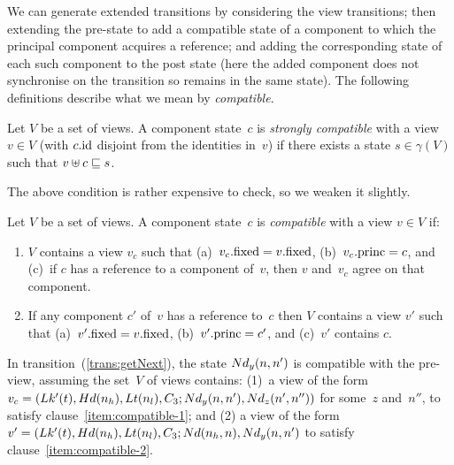 We can generate extended transitions by considering the view transitions; then
extending the pre-state to add a compatible state of a component to which the
principal component acquires a reference; and adding the corresponding state
of each such component to the post state (here the added component does not
synchronise on the transition so remains in the same state).  The following
definitions describe what we mean by \emph{compatible}.


\begin{definition}
Let $V$ be a set of views.  A component state~$c$ is \emph{strongly
  compatible} with a view~$v \in V$ (with $c.\mathrm{id}$ disjoint from the identities
in~$v$) if there exists a state $s \in \gamma(V)$ such that $v \uplus c \sqsubseteq
s$.
\end{definition}
%
The above condition is rather expensive to check, so we weaken it slightly. 
%
\begin{definition}
\label{def:compatible}
Let $V$ be a set of views.  A component state~$c$ is \emph{compatible} with a
view $v \in V$ if:
%
\begin{enumerate}
\item\label{item:compatible-1} $V$ contains a view $v_c$ such that
  (a)~$v_c.\mathrm{fixed} = v.\mathrm{fixed}$, (b)~$v_c.\mathrm{princ} = c$, and (c)~if $c$ has a
  reference to a component of~$v$, then $v$ and~$v_c$ agree on that component.

\item\label{item:compatible-2} If any component $c'$ of~$v$ has a reference
  to~$c$ then $V$ contains a view $v'$ such that (a)~$v'.\mathrm{fixed} = v.\mathrm{fixed}$,
  (b)~$v'.\mathrm{princ} = c'$, and (c)~$v'$ contains $c$.
\end{enumerate}
\end{definition}

In transition~(\ref{trans:getNext}), the state $Nd_y(n, n')$ is compatible
with the pre-view, assuming the set~$V$ of views contains: (1)~a view of the
form $v_c = (\Lock'(t), \Head(n_h), \Last(n_l), \Con_3; \Node_y(n, n'),
\linebreak[1] \Node_z(n', n''))$ for some~$z$ and~$n''$, to satisfy
clause~\ref{item:compatible-1}; and (2) a view of the form $v' = (\Lock'(t),
\Head(n_h), \Last(n_l), \Con_3; \Node(n_h, n), \linebreak[1] \Node_y(n, n')$
to satisfy clause~\ref{item:compatible-2}.

